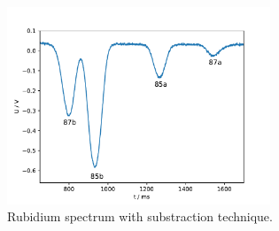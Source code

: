 \begin{figure}
  \centering
  \includegraphics[width=0.7\textwidth]{Pics/Rb_spectrum_subst.pdf}
  \caption{Rubidium spectrum with substraction technique.}
  \label{fig:spectrum_sub}
\end{figure}
